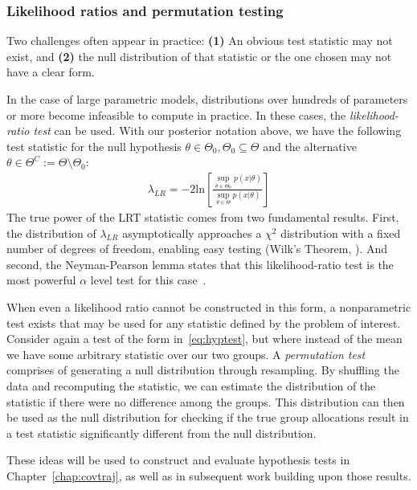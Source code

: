\subsubsection{Likelihood ratios and permutation testing}
Two challenges often appear in practice:
\textbf{(1)} An obvious test statistic may not exist,
and \textbf{(2)} the null distribution of that statistic
or the one chosen may not have a clear form.

In the case of large parametric models,
distributions over hundreds of parameters or more
become infeasible to compute in practice. In these
cases, the \textit{likelihood-ratio test} can be used.
With our posterior notation above, we have the following
test statistic for the null hypothesis $\theta\in\Theta_0, \Theta_0\subseteq\Theta$ and the alternative $\theta\in\Theta^C:=\Theta\setminus\Theta_0$:
\begin{align}\label{eq:lrt}
\lambda_{LR} = -2\text{ln}\left[ \frac{\sup_{\theta\in\Theta_0}p(x|\theta)}{\sup_{\theta\in\Theta} p(x|\theta)} \right]
\end{align}
The true power of the LRT statistic comes from two fundamental results.
First, the distribution of $\lambda_{LR}$
asymptotically approaches a $\chi^2$ distribution
with a fixed number of degrees of freedom,
enabling easy testing (Wilk's Theorem, \citep{wilks}).
And second,
the Neyman-Pearson lemma states
that this likelihood-ratio test is the 
most powerful $\alpha$ level test for this case~\citep{neymanpearson}.

When even a likelihood ratio cannot be constructed in this form,
a nonparametric test exists that may be used
for any statistic defined by the problem of interest.
Consider again a test of the form in~\eqref{eq:hyptest},
but where instead of the mean we have some arbitrary
statistic over our two groups.
A \textit{permutation test} comprises
of generating a null distribution through
resampling. By shuffling the data
and recomputing the statistic,
we can estimate the distribution of the
statistic if there were no difference among the groups.
This distribution can then be used
as the null distribution for checking
if the true group allocations result in a 
test statistic significantly different
from the null distribution.

These ideas will be used to construct
and evaluate 
hypothesis tests in Chapter~\ref{chap:covtraj},
as well as in subsequent work building upon
those results.